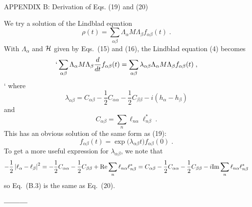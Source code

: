 \vspace{10pt}

\begin{center}
{APPENDIX B: Derivation of Eqs. (19) and (20) }
\end{center}
\renewcommand{\theequation}{B.\arabic{equation}}
\setcounter{equation}{0}

We try a solution of the Lindblad equation
\begin{equation}
\rho(t)=\sum_{\alpha\beta}\Lambda_\alpha M \Lambda_\beta f_{\alpha\beta}(t)\;.
\end{equation}
With $\Lambda_\alpha$ and ${\cal H}$ given by Eqs.~(15) and (16), the Lindblad equation (4) becomes
\begin{equation}`\sum_{\alpha\beta}\Lambda_\alpha M \Lambda_\beta\frac{d}{dt} f_{\alpha\beta}(t)=\sum_{\alpha\beta}\lambda_{\alpha\beta}\Lambda_\alpha M \Lambda_\beta f_{\alpha\beta}(t)\;,
\end{equation}`
where 
\begin{equation}
\lambda_{\alpha\beta}=C_{\alpha\beta}-\frac{1}{2}C_{\alpha\alpha}-\frac{1}{2}C_{\beta\beta}-i(h_\alpha-h_\beta)
\end{equation}
and
\begin{equation}
C_{\alpha\beta}=\sum_n \ell_{n\alpha}\ell_{n\beta}^*\;.
\end{equation}
This has an obvious solution of the same form as (19):
\begin{equation}
f_{\alpha\beta}(t)=\exp\Big(\lambda_{\alpha\beta}t\Big)f_{\alpha\beta}(0)\;.
\end{equation}
To get a more useful expression for $\lambda_{\alpha\beta}$, we note that 
$$-\frac{1}{2}\left|\ell_{\alpha}-\ell_{\beta}\right|^2=-\frac{1}{2}C_{\alpha\alpha}-\frac{1}{2}C_{\beta\beta}+{\rm Re}\sum_n \ell_{n\alpha}\ell_{n\beta}^*=C_{\alpha\beta}-\frac{1}{2}C_{\alpha\alpha}-\frac{1}{2}C_{\beta\beta}-i{\rm Im}\sum_n \ell_{n\alpha}\ell_{n\beta}^* $$
so Eq.~(B.3) is the same as Eq.~(20).



\vspace{10pt}

\begin{center}
{\bf ---------}
\end{center}

\vspace{10pt}

